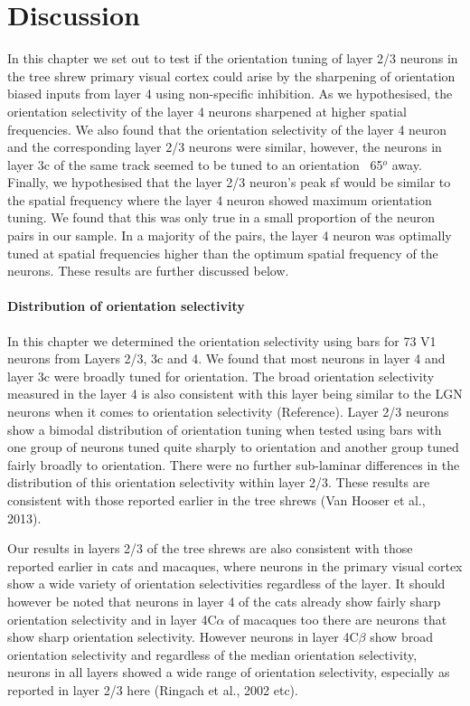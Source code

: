 \section{Discussion}

In this chapter we set out to test if the orientation tuning of layer 2/3 neurons in the tree shrew primary visual cortex could arise by the sharpening of orientation biased inputs from layer 4 using non-specific inhibition. As we hypothesised, the orientation selectivity of the layer 4 neurons sharpened at higher spatial frequencies. We also found that the orientation selectivity of the layer 4 neuron and the corresponding layer 2/3 neurons were similar, however, the neurons in layer 3c of the same track seemed to be tuned to an orientation ~65$^o$ away. Finally, we hypothesised that the layer 2/3 neuron's peak sf would be similar to the spatial frequency where the layer 4 neuron showed maximum orientation tuning. We found that this was only true in a small proportion of the neuron pairs in our sample. In a majority of the pairs, the layer 4 neuron was optimally tuned at spatial frequencies higher than the optimum spatial frequency of the neurons. These results are further discussed below.


\paragraph{Distribution of orientation selectivity}

In this chapter we determined the orientation selectivity using bars for 73 V1 neurons from Layers 2/3, 3c and 4. We found that most neurons in layer 4 and layer 3c were broadly tuned for orientation. The broad orientation selectivity measured in the layer 4 is also consistent with this layer being similar to the LGN neurons when it comes to orientation selectivity (Reference). Layer 2/3 neurons show a bimodal distribution of orientation tuning when tested using bars with one group of neurons tuned quite sharply to orientation and another group tuned fairly broadly to orientation. There were no further sub-laminar differences in the distribution of this orientation selectivity within layer 2/3. These results are consistent with those reported earlier in the tree shrews (Van Hooser et al., 2013). 

Our results in layers 2/3 of the tree shrews are also consistent with those reported earlier in cats and macaques, where neurons in the primary visual cortex show a wide variety of orientation selectivities regardless of the layer. It should however be noted that neurons in layer 4 of the cats already show fairly sharp orientation selectivity and in layer 4C$\alpha$ of macaques too there are neurons that show sharp orientation selectivity. However neurons in layer 4C$\beta$ show broad orientation selectivity and regardless of the median orientation selectivity, neurons in all layers showed a wide range of orientation selectivity, especially as reported in layer 2/3 here (Ringach et al., 2002 etc).

